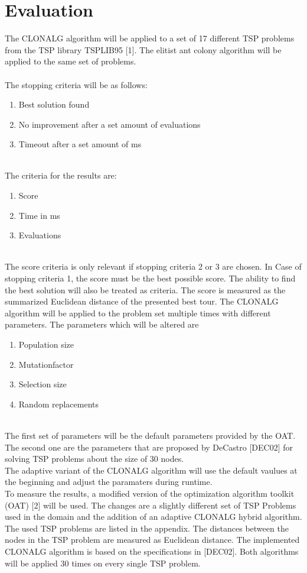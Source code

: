 \chapter{Evaluation}
\label{chap:eva}

The CLONALG algorithm will be applied to a set of 17 different TSP problems from the TSP library TSPLIB95 [1]. The elitist ant colony algorithm will be applied to the same set of problems.\\\\ 
The stopping criteria will be as follows:
\begin{enumerate}
	\item 	Best solution found
	\item 	No improvement after a set amount of evaluations
	\item 	Timeout after a set amount of ms
\end{enumerate}\\
The criteria for the results are:
\begin{enumerate}
	\item 	Score
	\item 	Time in ms
	\item 	Evaluations	
\end{enumerate}\\
The score criteria is only relevant if stopping criteria 2 or 3 are chosen. In Case of stopping criteria 1, the score must be the best possible score. The ability to find the best solution will also be treated as criteria. The score is measured as the summarized Euclidean distance of the presented best tour. The CLONALG algorithm will be applied to the problem set multiple times with different parameters.
The parameters which will be altered are
\begin{enumerate}
	\item 	Population size
	\item 	Mutationfactor
	\item 	Selection size
	\item 	Random replacements	
\end{enumerate}\\
The first set of parameters will be the default parameters provided by the OAT. The second one are the parameters that are proposed by DeCastro [DEC02] for solving TSP problems about the size of 30 nodes.\\
The adaptive variant of the CLONALG algorithm will use the default vaulues at the beginning and adjust the paramaters during runtime.\\
To measure the results, a modified version of the optimization algorithm toolkit (OAT) [2] will be used. The changes are a slightly different set of TSP Problems used in the domain and the addition of an adaptive CLONALG hybrid algorithm. The used TSP problems are listed in the appendix. The distances between the nodes in the TSP problem are measured as Euclidean distance. The implemented CLONALG algorithm is based on the specifications in [DEC02]. 
Both algorithms will be applied 30 times on every single TSP problem. 
